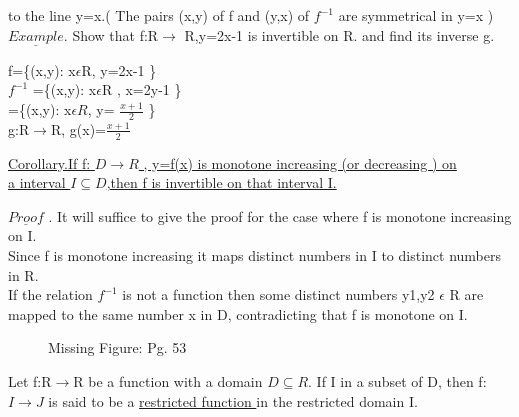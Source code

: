 \documentclass[11pt]{amsbook}
\begin{document}
to the line y=x.( The pairs (x,y) of f and (y,x) of $f^{-1}$ are symmetrical in y=x )\\

$\underline{Example}$.  Show that f:R$\rightarrow$ R,y=2x-1 is invertible on R. and find its inverse g.

       \begin{center}
        f=\{(x,y): x$\epsilon$R, y=2x-1 \}\\

        $f^{-1}$ =\{(x,y): x$\epsilon$R , x=2y-1 \}\\

         =\{(x,y): x$\epsilon R$, y= $\frac{x+1}{2}$ \}\\

         g:R$\rightarrow$R, g(x)=$\frac{x+1}{2}$\\
       \end{center}


\underline{Corollary.If f:  $D\rightarrow R$ , y=f(x) is monotone increasing (or decreasing ) on} \\
\underline{a interval $I \subseteq D$,then f is invertible on that interval I.}

\begin{minipage}[t]{0.6\textwidth}
\vspace{0pt}
    $\underline{Proof}$ . It will suffice to give the proof for the case where f is monotone increasing on I.\\

    Since f is monotone  increasing it maps distinct numbers in I to distinct numbers in R.\\

    If the relation $f^{-1}$ is not a function then some distinct numbers y1,y2 $\epsilon$ R are mapped to the same number x in D,
    contradicting that f is monotone on I.\\
\end{minipage}
\hfill
\begin{figure}[htb]
\begin{minipage}[t]{0.8\textwidth}
\centering\vspace{0pt}

\caption{Missing Figure: Pg. 53}
\end{minipage}

\end{figure}

    Let f:R$\rightarrow$R be a function with a domain $D\subseteq R$. If I in a subset of D, then f:$I\rightarrow J$ is said to be a
    \underline{ restricted  function } in the restricted domain I.\\
\end{document}
